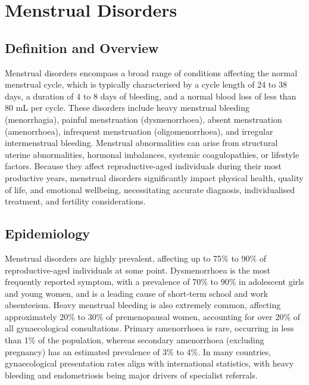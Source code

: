 \chapter{Menstrual Disorders}

\section*{Definition and Overview}
Menstrual disorders encompass a broad range of conditions affecting the normal menstrual cycle, which is typically characterised by a cycle length of 24 to 38 days, a duration of 4 to 8 days of bleeding, and a normal blood loss of less than 80 mL per cycle. These disorders include heavy menstrual bleeding (menorrhagia), painful menstruation (dysmenorrhoea), absent menstruation (amenorrhoea), infrequent menstruation (oligomenorrhoea), and irregular intermenstrual bleeding. Menstrual abnormalities can arise from structural uterine abnormalities, hormonal imbalances, systemic coagulopathies, or lifestyle factors. Because they affect reproductive-aged individuals during their most productive years, menstrual disorders significantly impact physical health, quality of life, and emotional wellbeing, necessitating accurate diagnosis, individualised treatment, and fertility considerations.

\section*{Epidemiology}
Menstrual disorders are highly prevalent, affecting up to 75\% to 90\% of reproductive-aged individuals at some point. Dysmenorrhoea is the most frequently reported symptom, with a prevalence of 70\% to 90\% in adolescent girls and young women, and is a leading cause of short-term school and work absenteeism. Heavy menstrual bleeding is also extremely common, affecting approximately 20\% to 30\% of premenopausal women, accounting for over 20\% of all gynaecological consultations. Primary amenorrhoea is rare, occurring in less than 1\% of the population, whereas secondary amenorrhoea (excluding pregnancy) has an estimated prevalence of 3\% to 4\%. In many countries, gynaecological presentation rates align with international statistics, with heavy bleeding and endometriosis being major drivers of specialist referrals.

